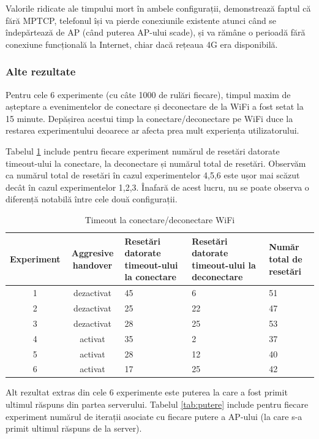 Valorile ridicate ale timpului mort în ambele configurații, demonstrează faptul că fără MPTCP, telefonul își va pierde conexiunile existente atunci când se îndepărtează de AP (când puterea AP-ului scade), și va rămâne o perioadă fără conexiune funcțională la Internet, chiar dacă rețeaua 4G era disponibilă. 

\subsubsection{Alte rezultate}

Pentru cele 6 experimente (cu câte 1000 de rulări fiecare), timpul maxim de așteptare a evenimentelor de conectare și deconectare de la WiFi a fost setat la 15 minute. Depășirea acestui timp la conectare/deconectare pe WiFi duce la restarea experimentului deoarece ar afecta prea mult experiența utilizatorului.

Tabelul \ref{tab:timeout} include pentru fiecare experiment numărul de resetări datorate timeout-ului la conectare, la deconectare și numărul total de resetări. Observăm ca numărul total de resetări în cazul experimentelor 4,5,6 este ușor mai scăzut decât în cazul experimentelor 1,2,3. Înafară de acest lucru, nu se poate observa o diferență notabilă între cele două configurații.

\begin{table}[h!]
\centering
\caption{Timeout la conectare/deconectare WiFi}
\label{tab:timeout}
\begin{tabular}{c | c | p{3cm} | p{3cm} | p{2cm}}
\hline
Experiment & Aggresive handover& Resetări datorate timeout-ului la conectare & Resetări datorate timeout-ului la deconectare  & Număr total de resetări \\
\hline
1 & dezactivat & 45 & 6 & 51 \\
2 & dezactivat & 25 & 22 & 47 \\
3 & dezactivat & 28 & 25 & 53 \\
4 & activat  & 35 & 2 & 37 \\
5 & activat & 28 & 12& 40 \\
6 & activat & 17 & 25 & 42 \\
\hline
\end{tabular}
\end{table}

Alt rezultat extras din cele 6 experimente este puterea la care a fost primit ultimul răspuns din partea serverului. Tabelul \ref{tab:putere} include pentru fiecare experiment numărul de iterații asociate cu fiecare putere a AP-ului (la care s-a primit ultimul răspuns de la server).

